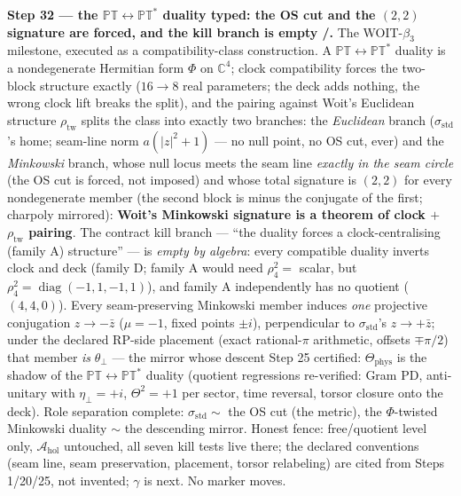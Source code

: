 \documentclass[11pt,a4paper]{article}
\theoremstyle{definition}
\begin{document}
\par\smallskip\noindent\textbf{Step 32 --- the $\mathbb{PT}\leftrightarrow\mathbb{PT}^*$
duality typed: the OS cut and the $(2,2)$ signature are forced, and the kill branch is empty
\mE/\mC.} The WOIT-$\beta_3$ milestone, executed as a compatibility-class construction.  A
$\mathbb{PT}\leftrightarrow\mathbb{PT}^*$ duality is a nondegenerate Hermitian form $\Phi$ on
$\mathbb{C}^4$; clock compatibility forces the two-block structure exactly ($16\to8$ real parameters;
the deck adds nothing, the wrong clock lift breaks the split), and the pairing against Woit's
Euclidean structure $\rho_{\mathrm{tw}}$ splits the class into exactly two branches: the
\emph{Euclidean} branch ($\sigma_{\mathrm{std}}$'s home; seam-line norm $a(|z|^2+1)$ --- no
null point, no OS cut, ever) and the \emph{Minkowski} branch, whose null locus meets the seam
line \emph{exactly in the seam circle} (the OS cut is forced, not imposed) and whose total
signature is $(2,2)$ for every nondegenerate member (the second block is minus the conjugate
of the first; charpoly mirrored): \textbf{Woit's Minkowski signature is a theorem of clock
$+$ $\rho_{\mathrm{tw}}$ pairing}.  The contract kill branch --- ``the duality forces a
clock-centralising (family A) structure'' --- is \emph{empty by algebra}: every compatible
duality inverts clock and deck (family D; family A would need $\rho_4^2=$ scalar, but
$\rho_4^2=\operatorname{diag}(-1,1,-1,1)$), and family A independently has no quotient
($(4,4,0)$).  Every seam-preserving Minkowski member induces \emph{one} projective
conjugation $z\to-\bar z$ ($\mu=-1$, fixed points $\pm i$), perpendicular to
$\sigma_{\mathrm{std}}$'s $z\to+\bar z$; under the declared RP-side placement (exact
rational-$\pi$ arithmetic, offsets $\mp\pi/2$) that member \emph{is} $\theta_\perp$ --- the
mirror whose descent Step 25 certified: $\Theta_{\mathrm{phys}}$ is the shadow of the
$\mathbb{PT}\leftrightarrow\mathbb{PT}^*$ duality (quotient regressions re-verified: Gram PD,
anti-unitary with $\eta_\perp=+i$, $\Theta^2=+1$ per sector, time reversal, torsor closure
onto the deck).  Role separation complete: $\sigma_{\mathrm{std}}\sim$ the OS cut (the
metric), the $\Phi$-twisted Minkowski duality $\sim$ the descending mirror.  Honest fence:
free/quotient level only, $\mathcal A_{\mathrm{hol}}$ untouched, all seven kill tests live
there; the declared conventions (seam line, seam preservation, placement, torsor relabeling)
are cited from Steps 1/20/25, not invented; $\gamma$ is next.  No marker moves.
\end{document}
